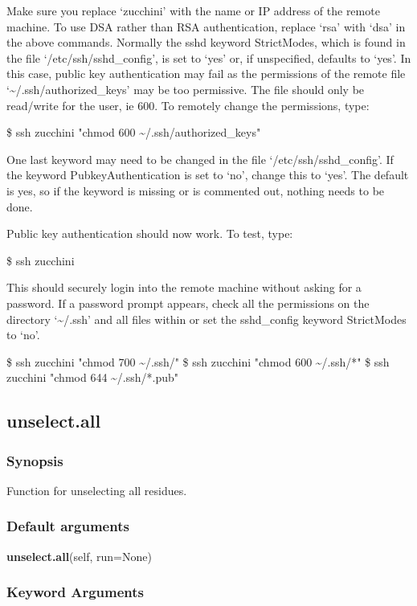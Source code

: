 Make sure you replace `zucchini' with the name or IP address of the remote machine.  To use
DSA rather than RSA authentication, replace `rsa' with `dsa' in the above commands.
Normally the sshd keyword StrictModes, which is found in the file `/etc/ssh/sshd\_config', is
set to `yes' or, if unspecified, defaults to `yes'.  In this case, public key authentication
may fail as the permissions of the remote file `\~{}/.ssh/authorized\_keys' may be too
permissive.  The file should only be read/write for the user, ie 600.  To remotely change
the permissions, type:

\$ ssh zucchini "chmod 600 \~{}/.ssh/authorized\_keys"

One last keyword may need to be changed in the file `/etc/ssh/sshd\_config'.  If the keyword
PubkeyAuthentication is set to `no', change this to `yes'.  The default is yes, so if the
keyword is missing or is commented out, nothing needs to be done.

Public key authentication should now work.  To test, type:

\$ ssh zucchini

This should securely login into the remote machine without asking for a password.  If a
password prompt appears, check all the permissions on the directory `\~{}/.ssh' and all files
within or set the sshd\_config keyword StrictModes to `no'.

\$ ssh zucchini "chmod 700 \~{}/.ssh/"
\$ ssh zucchini "chmod 600 \~{}/.ssh/*"
\$ ssh zucchini "chmod 644 \~{}/.ssh/*.pub"


\newpage

\subsection{unselect.all}


\subsubsection{Synopsis}

Function for unselecting all residues.

\subsubsection{Default arguments}

\textsf{\textbf{unselect.all}(self, run=None)}


\subsubsection{Keyword Arguments}

